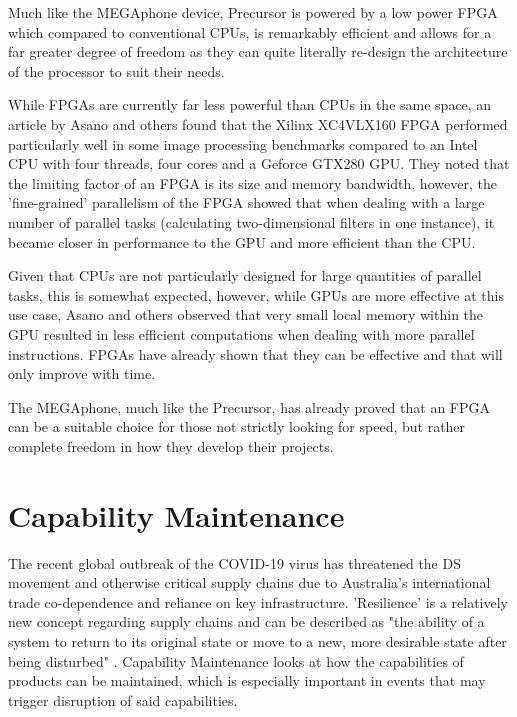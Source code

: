 Much like the MEGAphone device, Precursor is powered by a low power FPGA which compared to conventional CPUs, is remarkably efficient and allows for a far greater degree of freedom as they can quite literally re-design the architecture of the processor to suit their needs.

While FPGAs are currently far less powerful than CPUs in the same space, an article by Asano and others \cite{fpga} found that the Xilinx XC4VLX160 FPGA performed particularly well in some image processing benchmarks compared to an Intel CPU with four threads, four cores and a Geforce GTX280 GPU.
They noted that the limiting factor of an FPGA is its size and memory bandwidth, however, the 'fine-grained' parallelism of the FPGA showed that when dealing with a large number of parallel tasks (calculating two-dimensional filters in one instance), it became closer in performance to the GPU and more efficient than the CPU.

Given that CPUs are not particularly designed for large quantities of parallel tasks, this is somewhat expected, however, while GPUs are more effective at this use case, Asano and others observed that very small local memory within the GPU resulted in less efficient computations when dealing with more parallel instructions.
FPGAs have already shown that they can be effective and that will only improve with time.

The MEGAphone, much like the Precursor, has already proved that an FPGA can be a suitable choice for those not strictly looking for speed, but rather complete freedom in how they develop their projects.

\section{Capability Maintenance} \label{Capability}
The recent global outbreak of the COVID-19 virus has threatened the DS movement and otherwise critical supply chains due to Australia's international trade co-dependence and reliance on key infrastructure.
'Resilience' is a relatively new concept regarding supply chains and can be described as "the ability of a system to return to its original state or move to a new, more desirable state after being disturbed" \cite{supply}.
Capability Maintenance looks at how the capabilities of products can be maintained, which is especially important in events that may trigger disruption of said capabilities.

